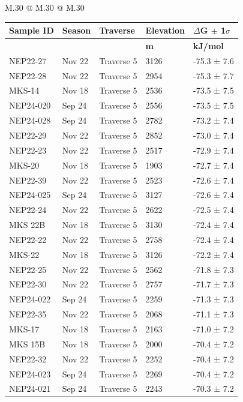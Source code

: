 \begin{landscape}
\begin{table}
\begin{tabular}{M{.30\textwidth} @{\hspace{4cm}} M{.30\textwidth} @{\hspace{4cm}} M{.30\textwidth}}
\begin{tabular}{l l l l l}
            \textbf{Sample ID}  &  \textbf{Season}  &  \textbf{Traverse}  &  \textbf{Elevation}  &  \textbf{$\Delta$G $\pm$ 1$\sigma$} \\
            \hline
            &   &   &  \textbf{m}  &  \textbf{kJ/mol} \\
            \hline
    NEP22-27 & Nov 22 & Traverse 5 & 3126 & -75.3 ±  7.6 \\
    NEP22-28 & Nov 22 & Traverse 5 & 2954 & -75.3 ±  7.7 \\
    MKS-14 & Nov 18 & Traverse 5 & 2536 & -73.5 ±  7.5 \\
    NEP24-020 & Sep 24 & Traverse 5 & 2556 & -73.5 ±  7.5 \\
    NEP24-028 & Sep 24 & Traverse 5 & 2782 & -73.2 ±  7.4 \\
    NEP22-29 & Nov 22 & Traverse 5 & 2852 & -73.0 ±  7.4 \\
    NEP22-23 & Nov 22 & Traverse 5 & 2517 & -72.9 ±  7.4 \\
    MKS-20 & Nov 18 & Traverse 5 & 1903 & -72.7 ±  7.4 \\
    NEP22-39 & Nov 22 & Traverse 5 & 2523 & -72.6 ±  7.4 \\
    NEP24-025 & Sep 24 & Traverse 5 & 3127 & -72.6 ±  7.4 \\
    NEP22-24 & Nov 22 & Traverse 5 & 2622 & -72.5 ±  7.4 \\
    MKS 22B & Nov 18 & Traverse 5 & 3130 & -72.4 ±  7.4 \\
    NEP22-22 & Nov 22 & Traverse 5 & 2758 & -72.4 ±  7.4 \\
    MKS-22 & Nov 18 & Traverse 5 & 3126 & -72.2 ±  7.4 \\
    NEP22-25 & Nov 22 & Traverse 5 & 2562 & -71.8 ±  7.3 \\
    NEP22-30 & Nov 22 & Traverse 5 & 2757 & -71.7 ±  7.3 \\
    NEP24-022 & Sep 24 & Traverse 5 & 2259 & -71.3 ±  7.3 \\
    NEP22-35 & Nov 22 & Traverse 5 & 2068 & -71.1 ±  7.3 \\
    MKS-17 & Nov 18 & Traverse 5 & 2163 & -71.0 ±  7.2 \\
    MKS 15B & Nov 18 & Traverse 5 & 2000 & -70.4 ±  7.2 \\
    NEP22-32 & Nov 22 & Traverse 5 & 2252 & -70.4 ±  7.2 \\
    NEP24-023 & Sep 24 & Traverse 5 & 2269 & -70.4 ±  7.2 \\
    NEP24-021 & Sep 24 & Traverse 5 & 2243 & -70.3 ±  7.2 \\

\end{tabular}
\end{tabular}
\end{table}
\end{landscape}
